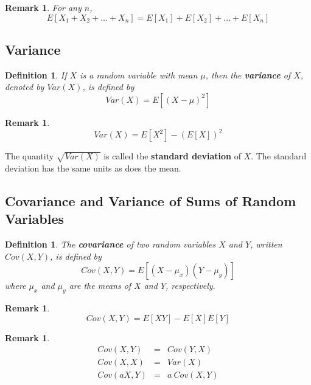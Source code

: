 \documentclass[12pt]{article}
\newtheorem{definition}[theorem]{Definition}
\newtheorem{remark}[theorem]{Remark}
\begin{document}
\begin{remark}
  For any $n$,
  \begin{equation*}
    E[X_1+X_2+\dots+X_n] = E[X_1] + E[X_2] + \dots + E[X_n]
  \end{equation*}
\end{remark}

\subsection{Variance}

\begin{definition}
  If $X$ is a random variable with mean $\mu$, then the \textbf{variance} of $X$, denoted by $Var(X)$, is defined by
  \begin{equation*}
    Var(X) = E[(X-\mu)^2]
  \end{equation*}
\end{definition}

\begin{remark}
  \begin{equation*}
    Var(X) = E[X^2] - (E[X])^2
  \end{equation*}
\end{remark}

The quantity $\sqrt{Var(X)}$ is called the \textbf{standard deviation} of $X$. The standard deviation has the same units as does the mean.

\subsection{Covariance and Variance of Sums of Random Variables}

\begin{definition}
  The \textbf{covariance} of two random variables $X$ and $Y$, written $Cov(X,Y)$, is defined by
  \begin{equation*}
    Cov(X,Y) = E[(X-\mu_x)(Y-\mu_y)]
  \end{equation*}
  where $\mu_x$ and $\mu_y$ are the means of $X$ and $Y$, respectively.
\end{definition}

\begin{remark}
  \begin{equation*}
    Cov(X,Y) = E[XY] - E[X]E[Y]
  \end{equation*}
\end{remark}

\begin{remark}
  \begin{eqnarray*}
    Cov(X,Y) &=& Cov(Y,X) \\
    Cov(X,X) &=& Var(X) \\
    Cov(aX,Y) &=& a \: Cov(X,Y)
  \end{eqnarray*}
\end{remark}
\end{document}
